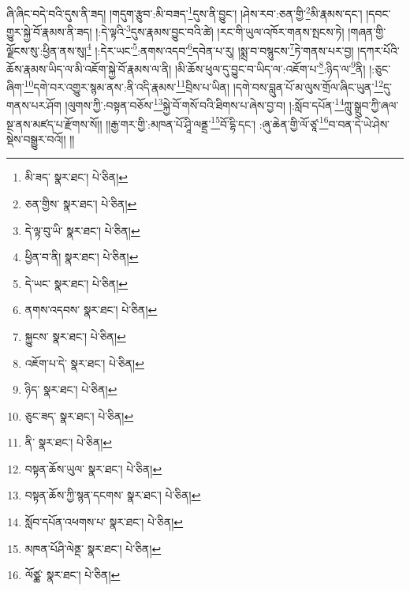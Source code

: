 ཞི་ཞིང་བདེ་བའི་དུས་ནི་ཟད། །གདུག་རྩུབ་:མི་བཟད་\footnote{མི་ཟད་  སྣར་ཐང་།  པེ་ཅིན། }དུས་ནི་བྱུང་། །ཤེས་རབ་:ཅན་གྱི་\footnote{ཅན་གྱིས་  སྣར་ཐང་།  པེ་ཅིན། }མི་རྣམས་དང་། །དབང་གྱུར་སྐྱེ་བོ་རྣམས་ནི་ཟད། །:དེ་ལྟའི་\footnote{དེ་ལྟ་བུ་ཡི་  སྣར་ཐང་།  པེ་ཅིན། }དུས་རྣམས་བྱུང་བའི་ཚེ། །རང་གི་ཡུལ་འཁོར་གནས་སྤངས་ཏེ། །གཞན་གྱི་ལྗོངས་སུ་:ཕྱིན་ནས་སུ།\footnote{ཕྱིན་བ་ནི།  སྣར་ཐང་།  པེ་ཅིན། } །:དེར་ཡང་\footnote{དེ་ཡང་  སྣར་ཐང་།  པེ་ཅིན། }:ནགས་འདབ་\footnote{ནགས་འདབས་  སྣར་ཐང་།  པེ་ཅིན། }དབེན་པ་རུ། །སྨྲ་བ་བསྙུངས་\footnote{སྐྱུངས་  སྣར་ཐང་།  པེ་ཅིན། }ཏེ་གནས་པར་བྱ། །དཀར་པོའི་ཆོས་རྣམས་ཡིད་ལ་མི་འཇོག་སྐྱེ་བོ་རྣམས་ལ་ནི། །མི་ཆོས་ཕུལ་དུ་བྱུང་བ་ཡིད་ལ་:འཇོག་པ་\footnote{འཇོག་པ་དེ་  སྣར་ཐང་།  པེ་ཅིན། }:ཉིད་ལ་\footnote{ཉིད་  སྣར་ཐང་།  པེ་ཅིན། }ནི། །:ཅུང་ཞིག་\footnote{ཅུང་ཟད་  སྣར་ཐང་།  པེ་ཅིན། }དགེ་བར་འགྱུར་སྙམ་ནས་:ནི་འདི་རྣམས་\footnote{ནི་  སྣར་ཐང་།  པེ་ཅིན། }བྲིས་པ་ཡིན། །དགེ་བས་བླུན་པོ་མ་ལུས་གྲོལ་ཞིང་ཡུན་\footnote{བསྟན་ཆོས་ཡུལ་  སྣར་ཐང་།  པེ་ཅིན། }དུ་གནས་པར་ཤོག །ལུགས་ཀྱི་:བསྟན་བཅོས་\footnote{བསྟན་ཆོས་ཀྱི་སྙན་དངགས་  སྣར་ཐང་།  པེ་ཅིན། }སྐྱེ་བོ་གསོ་བའི་ཐིགས་པ་ཞེས་བྱ་བ། །:སློབ་དཔོན་\footnote{སློབ་དཔོན་འཕགས་པ་  སྣར་ཐང་།  པེ་ཅིན། }ཀླུ་སྒྲུབ་ཀྱི་ཞལ་སྔ་ནས་མཛད་པ་རྫོགས་སོ།། །།རྒྱ་གར་གྱི་:མཁན་པོ་ཤཱི་ལནྡྲ་\footnote{མཁན་པོཤི་ལེནྡ་  སྣར་ཐང་།  པེ་ཅིན། }བོ་དྷི་དང་། :ཞུ་ཆེན་གྱི་ལོ་ཙཱ་\footnote{ལོཙྪ་  སྣར་ཐང་།  པེ་ཅིན། }བ་བན་དེ་ཡེ་ཤེས་སྡེས་བསྒྱུར་བའོ།། །།